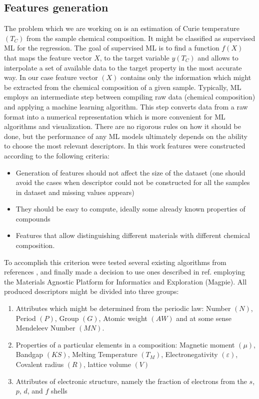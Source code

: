 \subsection{Features generation}

The problem which we are working on is an estimation of Curie temperature $(T_C)$ from the sample chemical composition. It might be classified as supervised ML for the regression. The goal of supervised ML is to find a function $f(X)$ that maps the feature vector $X$, to the target variable $y(T_C)$ and allows to interpolate a set of available data to the target property in the most accurate way. In our case feature vector $(X)$ contains only the information which might be extracted from the chemical composition of a given sample. Typically, ML employs an intermediate step between compiling raw data (chemical composition) and applying a machine learning algorithm. This step converts data from a raw format into a numerical representation which is more convenient for ML algorithms and visualization. There are no rigorous rules on how it should be done, but the performance of any ML models ultimately depends on the ability to choose the most relevant descriptors.
In this work features were constructed according to the following criteria:

\begin{itemize}
\item Generation of features should not affect the size of the dataset (one should avoid the cases when descriptor could not be constructed for all the samples in dataset and missing values appears)
\item They should be easy to compute, ideally some already known properties of compounds
\item Features that allow distinguishing different materials with different chemical composition.
\end{itemize}

To accomplish this criterion were tested several existing algorithms from references \cite{Rajan:2005tl,  Rajan:2015wo,  Lookman:2016tw,  Agrawal:2016uy}, and finally made a decision to use ones described in ref.  \cite{Ward:2016va,  Ward:2018wr} employing the Materials Agnostic Platform for Informatics and Exploration (Magpie).
All produced descriptors might be divided into three groups:

\begin{enumerate}
  \item Attributes which might be determined from the periodic law: Number $(N)$, Period $(P)$, Group $(G)$, Atomic weight $(AW)$ and at some sense Mendeleev Number $(MN)$.
  \item Properties of a particular elements in a composition: Magnetic moment $(\mu)$, Bandgap $(KS)$, Melting Temperature $(T_M)$, Electronegativity $(\varepsilon)$,  Covalent radius $(R)$, lattice volume $(V)$
  \item Attributes of electronic structure, namely the fraction of electrons from the $s$, $p$, $d$, and $f$ shells
\end{enumerate}

